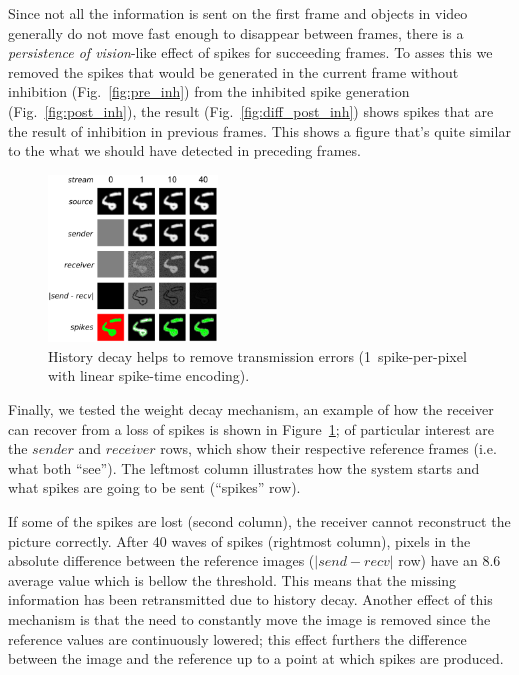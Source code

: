 \documentclass[conference]{IEEEtran}
\begin{document}
Since not all the information is sent on the first frame and objects in video generally do not move fast enough to disappear between frames, there is a \textit{persistence of vision}-like effect of spikes for succeeding frames. To asses this we removed the spikes that would be generated in the current frame without inhibition (Fig.~\ref{fig:pre_inh}) from the inhibited spike generation (Fig.~\ref{fig:post_inh}), the result (Fig.~\ref{fig:diff_post_inh}) shows spikes that are the result of inhibition in previous frames. This shows a figure that's quite similar to the what we should have detected in preceding frames.

\begin{figure}[hbt]
  \centering
  
  \includegraphics[width=0.4\textwidth]{history_decay}
  \caption{History decay helps to remove transmission errors (1~spike-per-pixel with linear spike-time encoding).}
  \label{fig:history_decay}
\end{figure}

Finally, we tested the weight decay mechanism, an example of how the receiver can recover from a loss of spikes is shown in Figure~\ref{fig:history_decay}; of particular interest are the $sender$ and $receiver$ rows, which show their respective reference frames (i.e. what both ``see''). The leftmost column illustrates how the system starts and what spikes are going to be sent (``spikes'' row).

If some of the spikes are lost (second column), the receiver cannot reconstruct the picture correctly. After 40 waves of spikes (rightmost column),  pixels in the absolute difference between the reference images ($|send-recv|$ row) have an 8.6 average value which is bellow the threshold. This means that the missing information has been retransmitted due to history decay. Another effect of this mechanism is that the need to constantly move the image is removed since the reference values are continuously lowered; this effect furthers the difference between the image and the reference up to a point at which spikes are produced.
\end{document}
